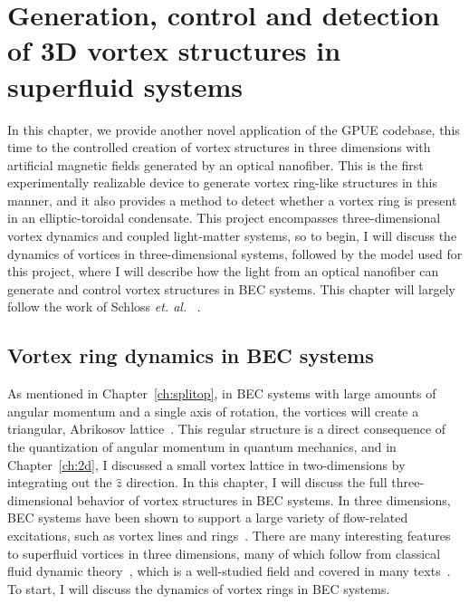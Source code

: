 \chapter{Generation, control and detection of 3D vortex structures in superfluid systems}
\label{ch:vortex_states}

In this chapter, we provide another novel application of the GPUE codebase, this time to the controlled creation of vortex structures in three dimensions with artificial magnetic fields generated by an optical nanofiber.
This is the first experimentally realizable device to generate vortex ring-like structures in this manner, and it also provides a method to detect whether a vortex ring is present in an elliptic-toroidal condensate.
This project encompasses three-dimensional vortex dynamics and coupled light-matter systems, so to begin, I will discuss the dynamics of vortices in three-dimensional systems, followed by the model used for this project, where I will describe how the light from an optical nanofiber can generate and control vortex structures in BEC systems.
This chapter will largely follow the work of Schloss \textit{et. al.}~\cite{schloss2019} .

\section{Vortex ring dynamics in BEC systems}
\label{sec:vortex}

As mentioned in Chapter~\ref{ch:splitop}, in BEC systems with large amounts of angular momentum and a single axis of rotation, the vortices will create a triangular, Abrikosov lattice~\cite{abo2001, abrikosov1957}. 
This regular structure is a direct consequence of the quantization of angular momentum in quantum mechanics, and in Chapter~\ref{ch:2d}, I discussed a small vortex lattice in two-dimensions by integrating out the $\hat z$ direction.
In this chapter, I will discuss the full three-dimensional behavior of vortex structures in BEC systems. 
In three dimensions, BEC systems have been shown to support a large variety of flow-related excitations, such as vortex lines and rings~\cite{madison2000,abo2001, wacks2014, anderson2001, bulgac2014, ku2016, matthews1999, yefsah2013}.
There are many interesting features to superfluid vortices in three dimensions, many of which follow from classical fluid dynamic theory~\cite{fetter2009}, which is a well-studied field and covered in many texts~\cite{faber1995, kundu2012, tritton1988, landau1987}.
To start, I will discuss the dynamics of vortex rings in BEC systems.

